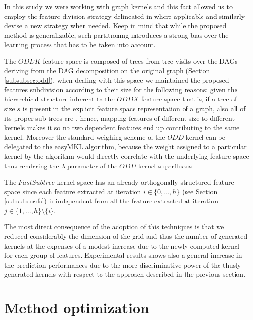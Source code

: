 In this study we were working with graph kernels and this fact allowed us to employ
the feature division strategy delineated in \cite{gmkl} where applicable and similarly
devise a new strategy when needed.
Keep in mind that while the proposed method is generalizable, such partitioning
introduces a strong bias over the learning process that has to be taken into account.

The $ODDK$ feature space is composed of trees from tree-visits
over the DAGs deriving from the DAG decomposition on the original graph (Section \ref{subsubsec:odd}),
when dealing with this space we maintained the proposed features subdivision
according to their size for the following reasons:
given the hierarchical structure inherent to the $ODDK$ feature space that is, if a tree
of size $s$ is present in the explicit feature space representation of a graph,
also all of its proper sub-trees are \cite{gmkl},
hence, mapping features of different size to different kernels makes it so no two
dependent features end up contributing to the same kernel.
Moreover the standard weighing scheme of the $ODD$ kernel can be delegated to
the easyMKL algorithm, because the weight assigned to a
particular kernel by the algorithm would directly correlate with the underlying
feature space thus rendering the $\lambda$ parameter of the $ODD$ kernel superfluous.

The $Fast Subtree$ kernel space has an already orthogonally structured feature
space since each feature extracted at iteration $i \in \{0,\dots,h\}$ (see Section \ref{subsubsec:fs})
is independent from all the feature extracted at iteration $j \in \{1,\dots,h\}\setminus \{i\}$.

The most direct consequence of the adoption of this techniques is that we reduced
considerably the dimension of the grid and thus the number of generated kernels at
the expenses of a modest increase due to the newly computed kernel for each group
of features.
Experimental results shows also a general increase in the prediction performances
due to the more discriminative power of the thusly generated kernels with respect
to the approach described in the previous section.


\section{Method optimization}
\label{sec:opt}

